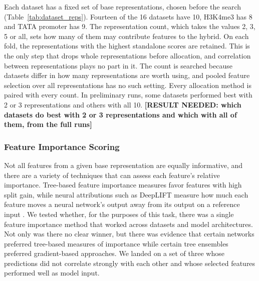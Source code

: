 Each dataset has a fixed set of base representations, chosen before the search (Table~\ref{tab:dataset_reps}). Fourteen of the 16 datasets have 10, H3K4me3 has 8 and TATA promoter has 9. The representation count, which takes the values 2, 3, 5 or all, sets how many of them may contribute features to the hybrid. On each fold, the representations with the highest standalone scores are retained. This is the only step that drops whole representations before allocation, and correlation between representations plays no part in it. The count is searched because datasets differ in how many representations are worth using, and pooled feature selection over all representations has no such setting. Every allocation method is paired with every count. In preliminary runs, some datasets performed best with 2 or 3 representations and others with all 10. \textbf{[RESULT NEEDED: which datasets do best with 2 or 3 representations and which with all of them, from the full runs]}

\subsubsection{Feature Importance Scoring}


Not all features from a given base representation are equally informative, and there are a variety of techniques that can assess each feature's relative importance. Tree-based feature importance measures favor features with high split gain, while neural attributions such as DeepLIFT measure how much each feature moves a neural network's output away from its output on a reference input \citep{Strobl2007, Ancona2018}.
We tested whether, for the purposes of this task, there was a single feature importance method that worked across datasets and model architectures. Not only was there no clear winner, but there was evidence that certain networks preferred tree-based measures of importance while certain tree ensembles preferred gradient-based approaches. We landed on a set of three whose predictions did not correlate strongly with each other and whose selected features performed well as model input.

